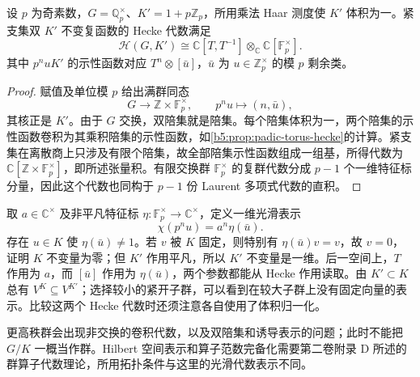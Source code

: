 \begin{proposition}\label{b5:prop:padic-torus-smaller-level}
	设 \(p\) 为奇素数，\(G=\mathbb Q_p^\times\)、\(K'=1+p\mathbb Z_p\)，所用乘法 Haar 测度使 \(K'\) 体积为一。紧支集双 \(K'\) 不变复函数的 Hecke 代数满足
	\[
		\mathcal H(G,K') \cong\mathbb C[T,T^{-1}]\otimes_{\mathbb C}\mathbb C[\mathbb F_p^\times].
	\]
	其中 \(p^nuK'\) 的示性函数对应 \(T^n\otimes[\bar u]\)，\(\bar u\) 为 \(u\in\mathbb Z_p^\times\) 的模 \(p\) 剩余类。
\end{proposition}
\begin{proof}
	赋值及单位模 \(p\) 给出满群同态
	\[
		G\longrightarrow\mathbb Z\times\mathbb F_p^\times, \qquad p^nu\longmapsto(n,\bar u),
	\]
	其核正是 \(K'\)。由于 \(G\) 交换，双陪集就是陪集。每个陪集体积为一，两个陪集的示性函数卷积为其乘积陪集的示性函数，如\cref{b5:prop:padic-torus-hecke}的计算。紧支集在离散商上只涉及有限个陪集，故全部陪集示性函数组成一组基，所得代数为 \(\mathbb C[\mathbb Z\times\mathbb F_p^\times]\)，即所述张量积。有限交换群 \(\mathbb F_p^\times\) 的复群代数分成 \(p-1\) 个一维特征标分量，因此这个代数也同构于 \(p-1\) 份 Laurent 多项式代数的直积。
\end{proof}

取 \(a\in\mathbb C^\times\) 及非平凡特征标 \(\eta:\mathbb F_p^\times\to\mathbb C^\times\)，定义一维光滑表示
\[
	\chi(p^nu)=a^n\eta(\bar u).
\]
存在 \(u\in K\) 使 \(\eta(\bar u)\ne1\)。若 \(v\) 被 \(K\) 固定，则特别有 \(\eta(\bar u)v=v\)，故 \(v=0\)，证明 \(K\) 不变量为零；但 \(K'\) 作用平凡，所以 \(K'\) 不变量是一维。后一空间上，\(T\) 作用为 \(a\)，而 \([\bar u]\) 作用为 \(\eta(\bar u)\)，两个参数都能从 Hecke 作用读取。由 \(K'\subset K\) 总有 \(V^K\subseteq V^{K'}\)；选择较小的紧开子群，可以看到在较大子群上没有固定向量的表示。比较这两个 Hecke 代数时还须注意各自使用了体积归一化。

\ProseParagraphBreak
更高秩群会出现非交换的卷积代数，以及双陪集和诱导表示的问题；此时不能把 \(G/K\) 一概当作群。Hilbert 空间表示和算子范数完备化需要第二卷附录 D 所述的群算子代数理论，所用拓扑条件与这里的光滑代数表示不同。
